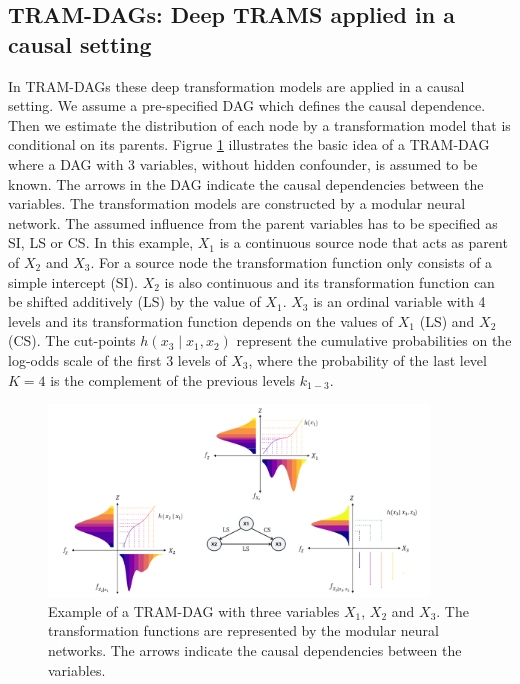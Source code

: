 \subsection{TRAM-DAGs: Deep TRAMS applied in a causal setting}



In TRAM-DAGs these deep transformation models are applied in a causal setting. We assume a pre-specified DAG which defines the causal dependence. Then we estimate the distribution of each node by a transformation model that is conditional on its parents. Figrue \ref{fig:tram_dag} illustrates the basic idea of a TRAM-DAG where a DAG with 3 variables, without hidden confounder, is assumed to be known. The arrows in the DAG indicate the causal dependencies between the variables. The transformation models are constructed by a modular neural network. The assumed influence from the parent variables has to be specified as SI, LS or CS. In this example, $X_1$ is a continuous source node that acts as parent of $X_2$ and $X_3$. For a source node the transformation function only consists of a simple intercept (SI). $X_2$ is also continuous and its transformation function can be shifted additively (LS) by the value of $X_1$. $X_3$ is an ordinal variable with 4 levels and its transformation function depends on the values of $X_1$ (LS) and $X_2$ (CS). The cut-points $h(x_3 \mid x_1, x_2)$ represent the cumulative probabilities on the log-odds scale of the first 3 levels of $X_3$, where the probability of the last level $K=4$ is the complement of the previous levels $k_{1-3}$.

\begin{figure}[H]
\centering
\includegraphics[width=0.9\textwidth]{img/tram_dag.png}
\caption{Example of a TRAM-DAG with three variables $X_1$, $X_2$ and $X_3$. The transformation functions are represented by the modular neural networks. The arrows indicate the causal dependencies between the variables.}
\label{fig:tram_dag}
\end{figure}

